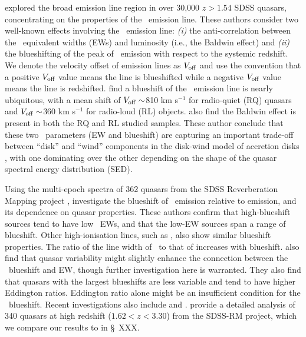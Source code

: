 \documentclass[fleqn,usenatbib]{mnras}
\begin{document}
\citet{Richards2011} explored the broad emission line region in over 30,000 $z > 1.54$
SDSS quasars, concentrating on the properties of the \civ\ emission
line. These authors consider two well-known effects involving the
\civ\ emission line: {\it (i)} the anti-correlation between the \civ\
equivalent widths (EWs) and luminosity (i.e., the Baldwin effect)
and {\it (ii)} the blueshifting of the peak of \civ\ emission
with respect to the systemic redshift.  We denote the velocity offset
of emission lines as $V_{\rm off}$ and use the convention that a
positive $V_{\rm off}$ value means the line is blueshifted while a
negative $V_{\rm off}$ value means the line is redshifted.
\citet{Richards2011} find a blueshift of the \civ\ emission line is
nearly ubiquitous, with a mean shift of $V_{\rm off}
\sim$810 km s$^{-1}$ for radio-quiet (RQ) quasars and $V_{\rm off}
\sim$360 km s$^{-1}$ for radio-loud (RL) objects. \citet{Richards2011}
also find the Baldwin effect is present in both the RQ and RL studied samples.
These author conclude that these two \civ\ parameters (EW and
blueshift) are capturing an important trade-off between ``disk'' and
``wind'' components in the disk-wind model of accretion disks
\citep[e.g.,][]{Murray1995, Elvis2000, Proga2000, Leighly2004b}, with
one dominating over the other depending on the shape of the quasar spectral energy distribution (SED).

Using the multi-epoch spectra of 362 quasars from the SDSS Reverberation Mapping project \citep[SDSS-RM; ][]{Shen2015,
Shen2019}, \citet{Sun2018} investigate the blueshift of \civ\
emission relative to \mgii emission, and its dependence on quasar
properties. These authors confirm that high-blueshift sources tend to
have low \civ\ EWs, and that the low-EW sources span a range of
blueshift. Other high-ionisation lines, such as \heii, also show
similar blueshift properties. The ratio of the line width of \civ\ to
that of \mgii increases with blueshift. \citet{Sun2018} also find that
quasar variability might slightly enhance the connection between the
\civ\ blueshift and EW, though further investigation here is
warranted. They also find that quasars with the
largest blueshifts are less variable and tend to have higher Eddington
ratios. 
Eddington ratio alone might be an insufficient condition for the \civ\
blueshift. Recent investigations also include \citet{Meyer2019} and
\citet{Doan2019}. \citet{Dyer2019} provide a detailed analysis of 340
quasars at high redshift ($1.62<z<3.30$) from the SDSS-RM project,
which we  compare our results to in \S~XXX.
\end{document}
